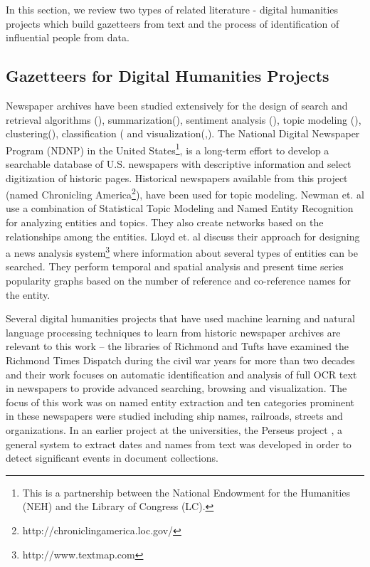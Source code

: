 In this section, we review two types of related literature - digital humanities projects which build gazetteers from text and the process of identification of influential people from data.

\subsection{Gazetteers for Digital Humanities Projects}
Newspaper archives have been studied extensively for the design of search and retrieval algorithms (\cite{Shahaf_11, Gabrilovich_04a, Alonso_10, Khurdiya_11}), summarization(\cite{McKeown95, Otterbacher06, Radev97, Radev01, Radev05}), sentiment analysis (\cite{balahur2009rethinking, godbole2007large, li2014sentiment}), topic modeling (\cite{Masand_92, Nallapati_04a, Radev99c, au2011studying, lee2010topic}), clustering(\cite{dutta2011learning}), classification (\cite{dutta2012using} and visualization(\cite{torget2011mapping},\cite{southall2014pastplace}). The National Digital Newspaper Program (NDNP) in the United States\footnote{This is a partnership between the National Endowment for the Humanities (NEH) and the Library of Congress (LC).}, is a long-term effort to develop a searchable database of U.S. newspapers with descriptive information and select digitization of historic pages. Historical newspapers available from this project (named Chronicling America\footnote{http://chroniclingamerica.loc.gov/}), have been used for topic modeling\cite{yang2011topic}. Newman et. al\cite{newman2006analyzing} use a combination of Statistical Topic Modeling and Named Entity Recognition for analyzing entities and topics. They also create networks based on the relationships among the entities.
Lloyd et. al \cite{lloyd2005lydia} discuss their approach for designing a news analysis system\footnote{http://www.textmap.com} where information about several types of entities can be searched. They perform temporal and spatial analysis and present time series popularity graphs based on the number of reference and co-reference names for the entity. %

Several digital humanities projects that have used machine learning and natural language processing techniques to learn from historic newspaper archives are relevant to this work -- the libraries of Richmond and Tufts have examined the Richmond Times Dispatch during the civil war years for more than two decades and their work focuses on automatic identification and analysis of full OCR text in newspapers to provide advanced searching, browsing and visualization\cite{crane2006challenge}. The focus of this work was on named entity extraction and ten categories prominent in these newspapers were studied including ship names, railroads, streets and organizations. In an earlier project at the universities, the Perseus project \cite{smith2002detectinga, smith2002detectingb, smith2001disambiguating}, a general system to extract dates and names from text was developed in order to detect significant events in document collections. 

